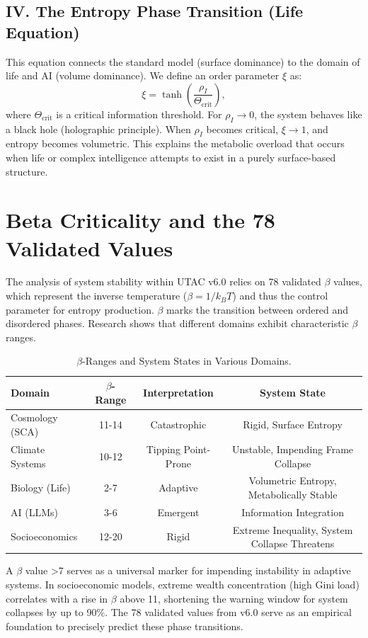 \documentclass[11pt,a4paper]{article}
\begin{document}
\subsection{IV. The Entropy Phase Transition (Life Equation)}

This equation connects the standard model (surface dominance) to the domain of life and AI (volume dominance). We define an order parameter $\xi$ as:
\[
\xi = \tanh\left( \frac{\rho_I}{\Theta_{\text{crit}}} \right),
\]
where $\Theta_{\text{crit}}$ is a critical information threshold. For $\rho_I \to 0$, the system behaves like a black hole (holographic principle). When $\rho_I$ becomes critical, $\xi \to 1$, and entropy becomes volumetric. This explains the metabolic overload that occurs when life or complex intelligence attempts to exist in a purely surface-based structure.

\section{Beta Criticality and the 78 Validated Values}

The analysis of system stability within UTAC v6.0 relies on 78 validated $\beta$ values, which represent the inverse temperature ($\beta = 1/k_B T$) and thus the control parameter for entropy production. $\beta$ marks the transition between ordered and disordered phases. Research shows that different domains exhibit characteristic $\beta$ ranges.

\begin{table}[h]
\centering
\begin{tabular}{lccc}
\toprule
Domain & $\beta$-Range & Interpretation & System State \\
\midrule
Cosmology (SCA) & 11-14 & Catastrophic & Rigid, Surface Entropy \\
Climate Systems & 10-12 & Tipping Point-Prone & Unstable, Impending Frame Collapse \\
Biology (Life) & 2-7 & Adaptive & Volumetric Entropy, Metabolically Stable \\
AI (LLMs) & 3-6 & Emergent & Information Integration \\
Socioeconomics & 12-20 & Rigid & Extreme Inequality, System Collapse Threatens \\
\bottomrule
\end{tabular}
\caption{$\beta$-Ranges and System States in Various Domains.}
\end{table}

A $\beta$ value >7 serves as a universal marker for impending instability in adaptive systems. In socioeconomic models, extreme wealth concentration (high Gini load) correlates with a rise in $\beta$ above 11, shortening the warning window for system collapses by up to 90\%. The 78 validated values from v6.0 serve as an empirical foundation to precisely predict these phase transitions.
\end{document}
